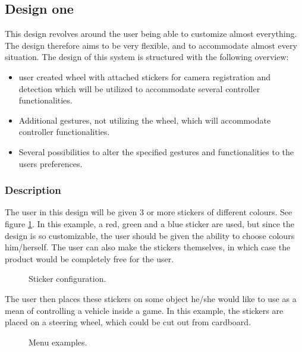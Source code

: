 \subsection{Design one}
\label{design1}
This design revolves around the user being able to customize almost everything. The design therefore aims to be very flexible, and to accommodate almost every situation. The design of this system is structured with the following overview:

\begin{itemize}
\item user created wheel with attached stickers for camera registration and detection which will be utilized to accommodate several controller functionalities.
\item Additional gestures, not utilizing the wheel, which will accommodate controller functionalities.
\item Several possibilities to alter the specified gestures and functionalities to the users preferences. 
\end{itemize}


\subsubsection*{Description}
The user in this design will be given 3 or more stickers of different colours. See figure \ref{fig:wheel}. In this example, a red, green and a blue sticker are used, but since the design is so customizable, the user should be given the ability to choose colours him/herself. The user can also make the stickers themselves, in which case the product would be completely free for the user.


\begin{figure}[!htbp]
\centering
{}
\caption{Sticker configuration.}\label{fig:wheel}
\end{figure}

The user then places these stickers on some object he/she would like to use as a mean of controlling a vehicle inside a game. In this example, the stickers are placed on a steering wheel, which could be cut out from cardboard.

\begin{figure}[!htbp]
\centering
{}
\caption{Menu examples.}\label{fig:select}
\end{figure}

